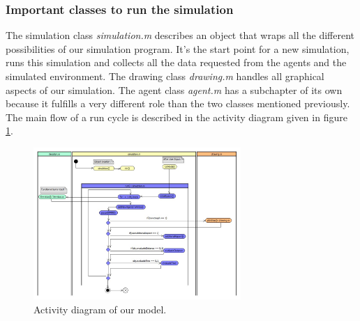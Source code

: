 \subsubsection{Important classes to run the simulation}
\noi The simulation class \textit{simulation.m} describes an object that wraps all the different possibilities of our simulation program. It's the start point for a new simulation, runs this simulation and collects all the data requested from the agents and the simulated environment. The drawing class \textit{drawing.m} handles all graphical aspects of our simulation. The agent class \textit{agent.m} has a subchapter of its own because it fulfills a very different role than the two classes mentioned previously.\\
The main flow of a run cycle is described in the activity diagram given in figure \ref{fig:activityDiagram}.\\
\begin{figure}[h!]
	\centering
		\includegraphics[width=0.70\textwidth]{pictures/activityDiagram}
	\caption{Activity diagram of our model.}
	\label{fig:activityDiagram}
\end{figure}

